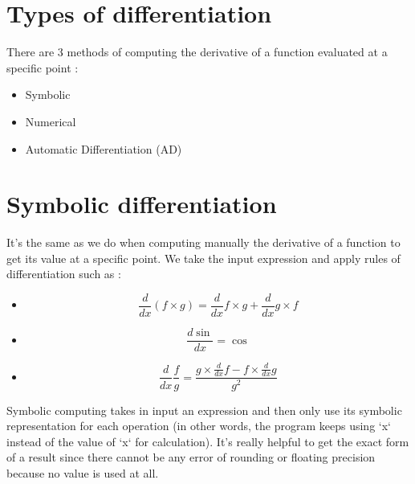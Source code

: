 \documentclass[12pt]{article}
\begin{document}
\thispagestyle{empty}
\noindent{}
\justify

\tableofcontents


%
%


\section*{Types of differentiation}

There are 3 methods of computing the derivative of a function evaluated at a specific point :

\begin{itemize}
\item Symbolic
\item Numerical
\item Automatic Differentiation (AD)
\end{itemize}


%
%

\section{Symbolic differentiation}


It's the same as we do when computing manually the derivative of a function to get its value at a specific point. We take the input expression and apply rules of differentiation such as :

\begin{itemize}
\item $$ \frac{d}{dx}(f \times g) = \frac{d}{dx}f \times g + \frac{d}{dx}g \times f $$
\item $$ \frac{d\sin}{dx} = \cos $$
\item $$\frac{d}{dx}\frac{f}{g} = \frac{ g \times \frac{d}{dx}f - f \times \frac{d}{dx}g }{g^2}$$
\end{itemize}

Symbolic computing takes in input an expression and then only use its symbolic representation for each operation (in other words, the program keeps using `x` instead of the value of `x` for calculation). It's really helpful to get the exact form of a result since there cannot be any error of rounding or floating precision because no value is used at all.
\end{document}
